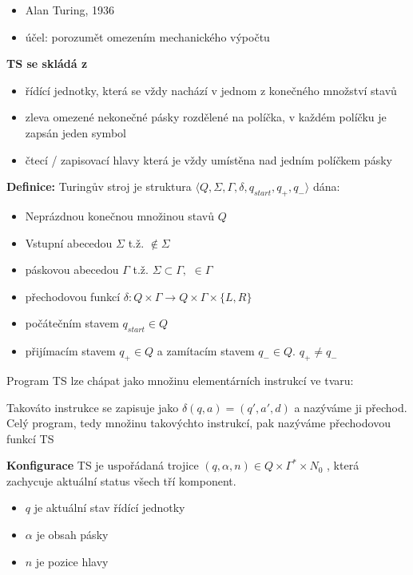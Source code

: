 \documentclass[10pt,a4paper]{article}
\theoremstyle{note}
\begin{document}
		\begin{itemize}
			\item Alan Turing, 1936
			\item účel: porozumět omezením mechanického výpočtu
		\end{itemize}
		\textbf{TS se skládá z}
		\begin{itemize}
			\item řídící jednotky, která se vždy nachází v jednom z konečného množství stavů
			\item zleva omezené nekonečné pásky rozdělené na políčka, v každém políčku je zapsán jeden symbol
			\item čtecí / zapisovací hlavy která je vždy umístěna nad jedním políčkem pásky
		\end{itemize}
		\textbf{Definice: }
		Turingův stroj je struktura $\langle Q, \Sigma, \Gamma, \delta, q_{start}, q_{+}, q_{-} \rangle $ dána:
		\begin{itemize}
			\item Neprázdnou konečnou množinou stavů $Q$
			\item Vstupní abecedou  $\Sigma$ t.ž. \textvisiblespace $ \notin \Sigma$
			\item páskovou abecedou $\Gamma$ t.ž. $\Sigma \subset \Gamma,$ \textvisiblespace $\in  \Gamma $
			\item přechodovou funkcí $\delta : Q \times  \Gamma \rightarrow Q \times \Gamma \times \{L , R \} $
			\item počátečním stavem $q_{start} \in Q$
			\item přijímacím stavem $q_{+} \in Q $ a zamítacím stavem $q_{-} \in Q.$ $q_{+} \neq q_{-}$
		\end{itemize}
		Program TS lze chápat jako množinu elementárních instrukcí ve tvaru:

		\textit{}

		Takováto instrukce se zapisuje jako $\delta (q,a) = (q', a', d)$ a nazýváme ji přechod. Celý program, tedy množinu 				takovýchto instrukcí, pak nazýváme přechodovou funkcí TS

		\textbf{Konfigurace} TS je uspořádaná trojice $(q, \alpha, n) \in Q \times \Gamma^{*} \times N_{0}$ , která zachycuje
		aktuální status všech tří komponent.
		\begin{itemize}
			\item $q$ je aktuální stav řídící jednotky
			\item $\alpha$ je obsah pásky
			\item $n$ je pozice hlavy
		\end{itemize}
\end{document}
